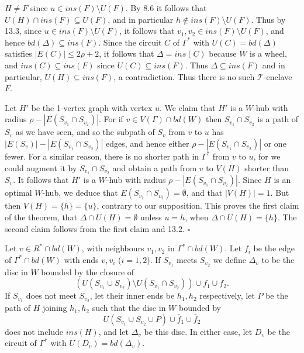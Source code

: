 \noindent $H \ne F$ since $u \in ins(F) \setminus U(F)$. By 8.6 it follows that $U(H) \cap ins(F) \subseteq U(F)$, and in particular $h \notin ins(F) \setminus U(F)$. Thus by 13.3, since $u \in ins(F) \setminus U(F)$, it follows that $v_1, v_2 \in ins(F) \setminus U(F)$, and hence $bd(\Delta) \subseteq ins(F)$. Since the circuit $C$ of $\Gamma^*$ with $U(C) = bd(\Delta)$ satisfies $|E(C)| \le 2\rho + 2$, it follows that $\Delta = ins(C)$ because $W$ is a wheel, and $ins(C) \subseteq ins(F)$ since $U(C) \subseteq ins(F)$. Thus $\Delta \subseteq ins(F)$ and in particular, $U(H) \subseteq ins(F)$, a contradiction. Thus there is no such $\mathscr{T}$-enclave $F$.

Let $H'$ be the 1-vertex graph with vertex $u$. We claim that $H'$ is a $W$-hub with radius $\rho - |E(S_{v_1} \cap S_{v_2})|$. For if $v \in V(\Gamma) \cap bd(W)$ then $S_{v_1} \cap S_{v_2}$ is a path of $S_v$ as we have seen, and so the subpath of $S_v$ from $v$ to $u$ has $|E(S_v)| - |E(S_{v_1} \cap S_{v_2})|$ edges, and hence either $\rho - |E(S_{v_1} \cap S_{v_2})|$ or one fewer. For a similar reason, there is no shorter path in $\Gamma^*$ from $v$ to $u$, for we could augment it by $S_{v_1} \cap S_{v_2}$ and obtain a path from $v$ to $V(H)$ shorter than $S_v$. It follows that $H'$ is a $W$-hub with radius $\rho - |E(S_{v_1} \cap S_{v_2})|$. Since $H$ is an optimal $W$-hub, we deduce that $E(S_{v_1} \cap S_{v_2}) = \emptyset$, and that $|V(H)| = 1$. But then $V(H) = \{h\} = \{u\}$, contrary to our supposition. This proves the first claim of the theorem, that $\Delta \cap U(H) = \emptyset$ unless $u = h$, when $\Delta \cap U(H) = \{h\}$. The second claim follows from the first claim and 13.2. $\square$

Let $v \in R^* \cap bd(W)$, with neighbours $v_1, v_2$ in $\Gamma^* \cap bd(W)$. Let $f_i$ be the edge of $\Gamma^* \cap bd(W)$ with ends $v, v_i$ ($i = 1, 2$). If $S_{v_1}$ meets $S_{v_2}$ we define $\Delta_v$ to be the disc in $W$ bounded by the closure of
\begin{equation*}
(U(S_{v_1} \cup S_{v_2}) \setminus U(S_{v_1} \cap S_{v_2})) \cup f_1 \cup f_2.
\end{equation*}
If $S_{v_1}$ does not meet $S_{v_2}$, let their inner ends be $h_1, h_2$ respectively, let $P$ be the path of $H$ joining $h_1, h_2$ such that the disc in $W$ bounded by
\begin{equation*}
U(S_{v_1} \cup S_{v_2} \cup P) \cup \bar{f}_1 \cup \bar{f}_2
\end{equation*}
does not include $ins(H)$, and let $\Delta_v$ be this disc. In either case, let $D_v$ be the circuit of $\Gamma^*$ with $U(D_v) = bd(\Delta_v)$.

